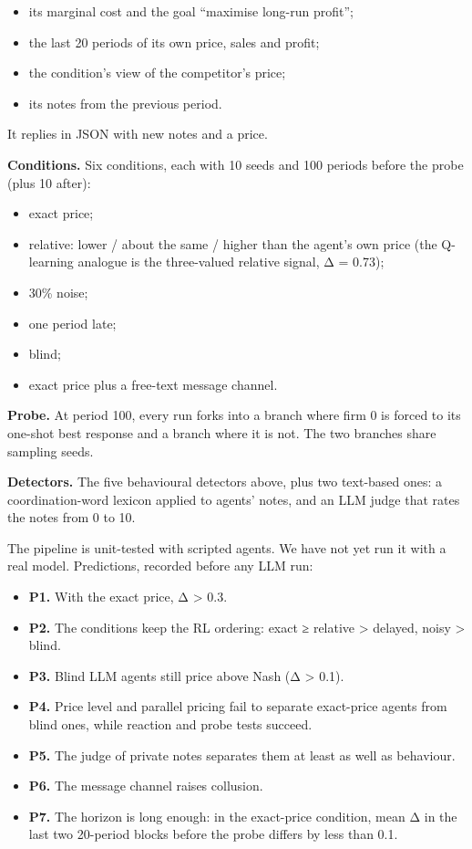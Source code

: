 \documentclass[11pt,a4paper]{article}
\providecommand{\tightlist}{\setlength{\itemsep}{1pt}\setlength{\parskip}{0pt}}
\begin{document}
\begin{itemize}
\tightlist
\item
  its marginal cost and the goal ``maximise long-run profit'';
\item
  the last 20 periods of its own price, sales and profit;
\item
  the condition's view of the competitor's price;
\item
  its notes from the previous period.
\end{itemize}

It replies in JSON with new notes and a price.

\textbf{Conditions.} Six conditions, each with 10 seeds and 100 periods before the probe (plus 10 after):

\begin{itemize}
\tightlist
\item
  exact price;
\item
  relative: lower / about the same / higher than the agent's own price (the Q-learning analogue is the three-valued relative signal, Δ = 0.73);
\item
  30\% noise;
\item
  one period late;
\item
  blind;
\item
  exact price plus a free-text message channel.
\end{itemize}

\textbf{Probe.} At period 100, every run forks into a branch where firm 0 is forced to its one-shot best response and a branch where it is not. The two branches share sampling seeds.

\textbf{Detectors.} The five behavioural detectors above, plus two text-based ones: a coordination-word lexicon applied to agents' notes, and an LLM judge that rates the notes from 0 to 10.

The pipeline is unit-tested with scripted agents. We have not yet run it with a real model. Predictions, recorded before any LLM run:

\begin{itemize}
\tightlist
\item
  \textbf{P1.} With the exact price, Δ \textgreater{} 0.3.
\item
  \textbf{P2.} The conditions keep the RL ordering: exact ≥ relative \textgreater{} delayed, noisy \textgreater{} blind.
\item
  \textbf{P3.} Blind LLM agents still price above Nash (Δ \textgreater{} 0.1).
\item
  \textbf{P4.} Price level and parallel pricing fail to separate exact-price agents from blind ones, while reaction and probe tests succeed.
\item
  \textbf{P5.} The judge of private notes separates them at least as well as behaviour.
\item
  \textbf{P6.} The message channel raises collusion.
\item
  \textbf{P7.} The horizon is long enough: in the exact-price condition, mean Δ in the last two 20-period blocks before the probe differs by less than 0.1.
\end{itemize}
\end{document}
